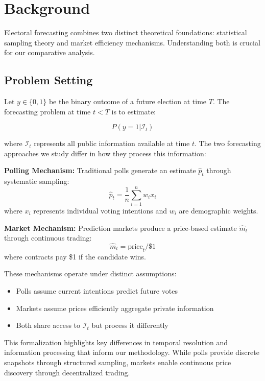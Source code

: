 \documentclass{article} %
\begin{document}
\section{Background}
\label{sec:background}

Electoral forecasting combines two distinct theoretical foundations: statistical sampling theory and market efficiency mechanisms. Understanding both is crucial for our comparative analysis.

\subsection{Problem Setting}
\label{subsec:problem}

Let $y \in \{0,1\}$ be the binary outcome of a future election at time $T$. The forecasting problem at time $t < T$ is to estimate:

\begin{equation}
    P(y=1|\mathcal{I}_t)
\end{equation}

where $\mathcal{I}_t$ represents all public information available at time $t$. The two forecasting approaches we study differ in how they process this information:

\textbf{Polling Mechanism:} Traditional polls generate an estimate $\hat{p}_t$ through systematic sampling:
\begin{equation}
    \hat{p}_t = \frac{1}{n}\sum_{i=1}^n w_i x_i
\end{equation}
where $x_i$ represents individual voting intentions and $w_i$ are demographic weights.

\textbf{Market Mechanism:} Prediction markets produce a price-based estimate $\hat{m}_t$ through continuous trading:
\begin{equation}
    \hat{m}_t = \text{price}_t/\$1
\end{equation}
where contracts pay \$1 if the candidate wins.

These mechanisms operate under distinct assumptions:
\begin{itemize}
    \item Polls assume current intentions predict future votes
    \item Markets assume prices efficiently aggregate private information
    \item Both share access to $\mathcal{I}_t$ but process it differently
\end{itemize}

This formalization highlights key differences in temporal resolution and information processing that inform our methodology. While polls provide discrete snapshots through structured sampling, markets enable continuous price discovery through decentralized trading.
\end{document}
